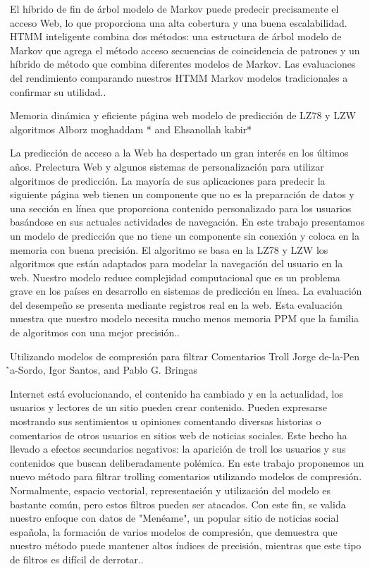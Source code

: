El híbrido de fin de árbol modelo de Markov puede predecir precisamente el acceso Web, lo que proporciona una alta cobertura y una buena escalabilidad. HTMM inteligente combina dos métodos: una estructura de árbol modelo de Markov que agrega el método acceso secuencias de coincidencia de patrones y un híbrido de método que combina diferentes modelos de Markov. Las evaluaciones del rendimiento comparando nuestros HTMM Markov modelos tradicionales a confirmar su utilidad..




Memoria dinámica y eficiente página web modelo de predicción de LZ78 y LZW algoritmos
Alborz moghaddam * and Ehsanollah kabir*

La predicción de acceso a la Web  ha despertado un gran interés en los últimos años. Prelectura Web y algunos sistemas de personalización para utilizar algoritmos de predicción. La mayoría de sus aplicaciones para predecir la siguiente  página web tienen un componente que no es la preparación de datos y una sección en línea que proporciona contenido personalizado para los usuarios basándose en sus actuales actividades de navegación. En este trabajo presentamos un modelo de predicción que no tiene un componente sin conexión y coloca en la memoria con  buena precisión. El algoritmo se basa en la LZ78 y LZW los algoritmos que están adaptados para modelar la navegación del usuario en la web. Nuestro modelo reduce complejidad computacional que es un problema grave en los países en desarrollo en sistemas de predicción en línea. La evaluación del desempeño se presenta mediante registros real en la web. Esta evaluación muestra que nuestro modelo necesita mucho menos memoria PPM que la familia de algoritmos con una mejor precisión..



Utilizando modelos de compresión para filtrar Comentarios Troll
Jorge de-la-Pen ̃a-Sordo, Igor Santos, and Pablo G. Bringas

Internet está evolucionando, el contenido ha cambiado y en la actualidad, los usuarios y lectores de un sitio pueden crear contenido. Pueden expresarse mostrando sus sentimientos u opiniones comentando diversas historias o comentarios de otros usuarios en sitios web de noticias sociales. Este hecho ha llevado a efectos secundarios negativos: la aparición de troll los usuarios y sus contenidos que buscan deliberadamente polémica. En este trabajo proponemos un nuevo método para filtrar trolling comentarios utilizando modelos de compresión. Normalmente, espacio vectorial, representación y utilización  del modelo  es bastante común, pero estos filtros pueden ser atacados. Con este fin, se valida nuestro enfoque con datos de "Menéame", un popular sitio de noticias social española, la formación de varios modelos de compresión, que demuestra que nuestro método puede mantener altos índices de precisión, mientras que este tipo de filtros es difícil de derrotar..



